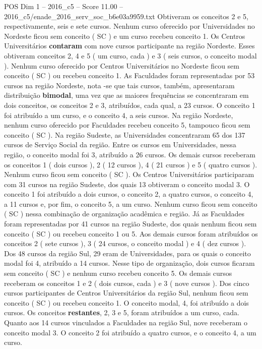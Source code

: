 \begin{textsample}{POS Dim 1 – 2016\_c5 – Score 11.00 – 2016\_c5/enade\_2016\_serv\_soc\_b6e03a9959.txt}
Obtiveram os conceitos 2 e 5, respectivamente, seis e sete cursos.
Nenhum curso oferecido por Universidades no Nordeste ficou sem conceito ( SC ) e um curso recebeu conceito 1.
Os Centros Universitários \textbf{contaram} com nove cursos participante na região Nordeste.
Esses obtiveram conceitos 2, 4 e 5 ( um curso, cada ) e 3 ( seis cursos, o conceito modal ).
Nenhum curso oferecido por Centros Universitários no Nordeste ficou sem conceito ( SC ) ou recebeu conceito 1.
As Faculdades foram representadas por 53 cursos na região Nordeste, nota -se que tais cursos, também, apresentaram distribuição \textbf{bimodal}, uma vez que as maiores frequências se concentraram em dois conceitos, os conceitos 2 e 3, atribuídos, cada qual, a 23 cursos.
O conceito 1 foi atribuído a um curso, e o conceito 4, a seis cursos.
Na região Nordeste, nenhum curso oferecido por Faculdades recebeu conceito 5, tampouco ficou sem conceito ( SC ).
Na região Sudeste, as Universidades concentraram 65 dos 137 cursos de Serviço Social da região.
Entre os cursos em Universidades, nessa região, o conceito modal foi 3, atribuído a 26 cursos.
Os demais cursos receberam os conceitos 1 ( dois cursos ), 2 ( 12 cursos ), 4 ( 21 cursos ) e 5 ( quatro cursos ).
Nenhum curso ficou sem conceito ( SC ).
Os Centros Universitários participaram com 31 cursos na região Sudeste, dos quais 13 obtiveram o conceito modal 3.
O conceito 1 foi atribuído a dois cursos, o conceito 2, a quatro cursos, o conceito 4, a 11 cursos e, por fim, o conceito 5, a um curso.
Nenhum curso ficou sem conceito ( SC ) nessa combinação de organização acadêmica e região.
Já as Faculdades foram representadas por 41 cursos na região Sudeste, dos quais nenhum ficou sem conceito ( SC ) ou recebeu conceito 1 ou 5.
Aos demais cursos foram atribuídos os conceitos 2 ( sete cursos ), 3 ( 24 cursos, o conceito modal ) e 4 ( dez cursos ).
Dos 48 cursos da região Sul, 29 eram de Universidades, para os quais o conceito modal foi 4, atribuído a 14 cursos.
Nesse tipo de organização, dois cursos ficaram sem conceito ( SC ) e nenhum curso recebeu conceito 5.
Os demais cursos receberam os conceitos 1 e 2 ( dois cursos, cada ) e 3 ( nove cursos ).
Dos cinco cursos participantes de Centros Universitários da região Sul, nenhum ficou sem conceito ( SC ) ou recebeu conceito 1.
O conceito modal, 4, foi atribuído a dois cursos.
Os conceitos \textbf{restantes}, 2, 3 e 5, foram atribuídos a um curso, cada.
Quanto aos 14 cursos vinculados a Faculdades na região Sul, nove receberam o conceito modal 3.
O conceito 2 foi atribuído a quatro cursos, e o conceito 4, a um curso.

\end{textsample}
